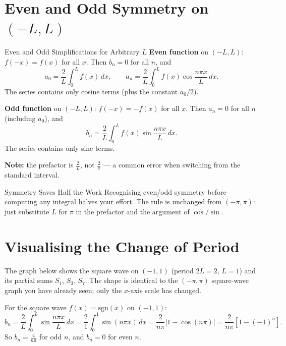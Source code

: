 \documentclass[12pt,a4paper]{article}
\begin{document}
\section{Even and Odd Symmetry on $(-L, L)$}

\begin{infobox}{Even and Odd Simplifications for Arbitrary $L$}
\textbf{Even function} on $(-L,L)$: $f(-x) = f(x)$ for all $x$. Then $b_n = 0$ for all $n$, and
\[
a_0 = \frac{2}{L}\int_0^L f(x)\,dx, \qquad
a_n = \frac{2}{L}\int_0^L f(x)\cos\frac{n\pi x}{L}\,dx.
\]
The series contains only cosine terms (plus the constant $a_0/2$).

\medskip
\textbf{Odd function} on $(-L,L)$: $f(-x) = -f(x)$ for all $x$. Then $a_n = 0$ for all $n$ (including $a_0$), and
\[
b_n = \frac{2}{L}\int_0^L f(x)\sin\frac{n\pi x}{L}\,dx.
\]
The series contains only sine terms.

\medskip
\noindent\textbf{Note:} the prefactor is $\frac{2}{L}$, not $\frac{2}{\pi}$ --- a common error when switching from the standard interval.
\end{infobox}

\begin{learnbox}{Symmetry Saves Half the Work}
Recognising even/odd symmetry before computing any integral halves your effort.
The rule is unchanged from $(-\pi,\pi)$: just substitute $L$ for $\pi$ in the prefactor and the argument of $\cos/\sin$.
\end{learnbox}

\section{Visualising the Change of Period}

The graph below shows the square wave on $(-1,1)$ (period $2L = 2$, $L = 1$) and its partial sums $S_1$, $S_3$, $S_7$.
The shape is identical to the $(-\pi,\pi)$ square-wave graph you have already seen; only the $x$-axis scale has changed.

For the square wave $f(x) = \text{sgn}(x)$ on $(-1,1)$:
\[
b_n = \frac{2}{L}\int_0^L \sin\frac{n\pi x}{L}\,dx = \frac{2}{1}\int_0^1 \sin(n\pi x)\,dx
     = \frac{2}{n\pi}\bigl[1-\cos(n\pi)\bigr] = \frac{2}{n\pi}[1-(-1)^n].
\]
So $b_n = \frac{4}{n\pi}$ for odd $n$, and $b_n = 0$ for even $n$.
\end{document}
